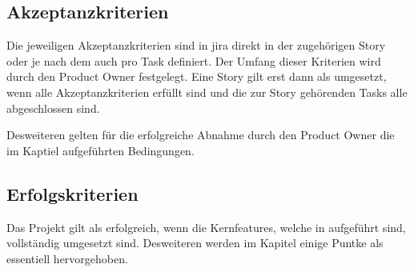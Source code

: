 \documentclass[../main.tex]{subfiles}
\begin{document}
	\subsection{Akzeptanzkriterien}
	\label{section:Akzeptanzkriterien}
	\par Die jeweiligen Akzeptanzkriterien sind in \gls{jira} direkt in der zugehörigen Story oder je nach dem auch pro Task definiert. Der Umfang dieser Kriterien wird durch den Product Owner festgelegt. Eine Story gilt erst dann als umgesetzt, wenn alle Akzeptanzkriterien erfüllt sind und die zur Story gehörenden Tasks alle abgeschlossen sind. 
	\par Desweiteren gelten für die erfolgreiche Abnahme durch den Product Owner die im Kaptiel  aufgeführten Bedingungen.

	\subsection{Erfolgskriterien}
	\par Das Projekt gilt als erfolgreich, wenn die Kernfeatures, welche in  aufgeführt sind, vollständig umgesetzt sind. Desweiteren werden im Kapitel  einige Puntke als essentiell hervorgehoben.
\end{document}
